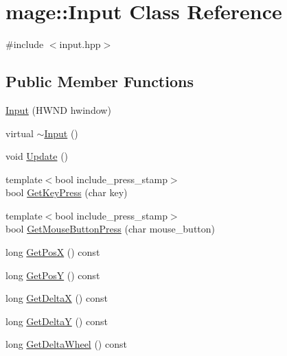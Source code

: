 \hypertarget{classmage_1_1_input}{}\section{mage\+:\+:Input Class Reference}
\label{classmage_1_1_input}


{\ttfamily \#include $<$input.\+hpp$>$}

\subsection*{Public Member Functions}
\begin{DoxyCompactItemize}
\item 
\hyperlink{classmage_1_1_input_a036b38f787b45d14ff92f360303b33af}{Input} (H\+W\+ND hwindow)
\item 
virtual \hyperlink{classmage_1_1_input_a52324bfe97e7245176f77ac9e635df53}{$\sim$\+Input} ()
\item 
void \hyperlink{classmage_1_1_input_ab152509540c3f41d337296edc2aea660}{Update} ()
\item 
{\footnotesize template$<$bool include\+\_\+press\+\_\+stamp$>$ }\\bool \hyperlink{classmage_1_1_input_a3d944c0dc60299561e6eb135f0494743}{Get\+Key\+Press} (char key)
\item 
{\footnotesize template$<$bool include\+\_\+press\+\_\+stamp$>$ }\\bool \hyperlink{classmage_1_1_input_a00bee37b589ac6e67293e0261ac50e9f}{Get\+Mouse\+Button\+Press} (char mouse\+\_\+button)
\item 
long \hyperlink{classmage_1_1_input_a5b839b6ead23e1c0ec623fb82c5d6e45}{Get\+PosX} () const
\item 
long \hyperlink{classmage_1_1_input_a4c7d46233ccf74d45c28549e5ecdd244}{Get\+PosY} () const
\item 
long \hyperlink{classmage_1_1_input_a6fcfe61fc9f5a2575375c7e2c39507f5}{Get\+DeltaX} () const
\item 
long \hyperlink{classmage_1_1_input_ac63b55db4438989d2c6729a358ace296}{Get\+DeltaY} () const
\item 
long \hyperlink{classmage_1_1_input_a59c042bc18b47bca3010eb4df7de44c2}{Get\+Delta\+Wheel} () const
\end{DoxyCompactItemize}
